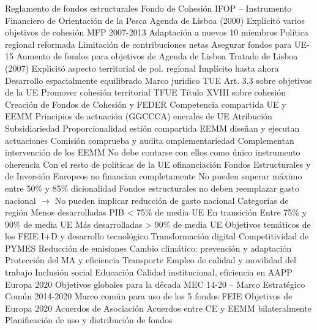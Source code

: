 \documentclass{nuevotema}
\begin{document}
\begin{esquemal}
				\4 Reglamento de fondos estructurales
				\4[] Fondo de Cohesión
				\4[] IFOP -- Instrumento Financiero de Orientación de la Pesca
			\3 Agenda de Lisboa (2000)
				\4 Explicitó varios objetivos de cohesión
			\3 MFP 2007-2013
				\4 Adaptación a nuevos 10 miembros
				\4 Política regional reformada
				\4[] Limitación de contribuciones netas
				\4[] Asegurar fondos para UE-15
				\4 Aumento de fondos para objetivos de Agenda de Lisboa
			\3 Tratado de Lisboa (2007)
				\4 Explicitó aspecto territorial de pol. regional
				\4[] Implícito hasta ahora
				\4[] Desarrollo espacialmente equilibrado
		\2 Marco jurídico
			\3 TUE
				\4 Art. 3.3 sobre objetivos de la UE
				\4[] Promover cohesión territorial
			\3 TFUE
				\4 Título XVIII sobre cohesión
				\4 Creación de Fondos de Cohesión y FEDER
				\4 Competencia compartida UE y EEMM
			\3 Principios de actuación (GGCCCA)
				\4 enerales de UE
				\4[] Atribución
				\4[] Subsidiariedad
				\4[] Proporcionalidad
				\4 estión compartida
				\4[] EEMM diseñan y ejecutan actuaciones
				\4[] Comisión comprueba y audita
				\4 omplementariedad
				\4[] Complementan intervención de los EEMM
				\4[] No debe contarse con ellos como único instrumento
				\4 oherencia
				\4[] Con el resto de políticas de la UE
				\4 ofinanciación
				\4[] Fondos Estructurales y de Inversión Europeos no financian completamente
				\4[] No pueden superar máximo entre 50\% y 85\%
				\4 dicionalidad
				\4[] Fondos estructurales no deben reemplazar gasto nacional
				\4[] $\to$ No pueden implicar reducción de gasto nacional
			\3 Categorías de región
				\4 Menos desarrolladas
				\4[] PIB < 75\% de media UE
				\4 En transición
				\4[] Entre 75\% y 90\% de media UE
				\4 Más desarrolladas
				\4[] > 90\% de media UE
			\3 Objetivos temáticos de los FEIE
				\4[1] I+D y desarrollo tecnológico
				\4[2] Transformación digital
				\4[3] Competitividad de PYMES
				\4[4] Reducción de emisiones
				\4[5] Cambio climático: prevención y adaptación
				\4[6] Protección del MA y eficiencia
				\4[7] Transporte
				\4[8] Empleo de calidad y movilidad del trabajo
				\4[9] Inclusión social
				\4[10] Educación
				\4[11] Calidad institucional, eficiencia en AAPP
			\3 Europa 2020
				\4 Objetivos globales para la década
			\3 MEC 14-20 -- Marco Estratégico Común 2014-2020
				\4 Marco común para uso de los 5 fondos FEIE
				\4 Objetivos de Europa 2020
			\3 Acuerdos de Asociación
				\4 Acuerdos entre CE y EEMM bilateralmente
				\4 Planificación de uso y distribución de fondos

\end{esquemal}
\end{document}
